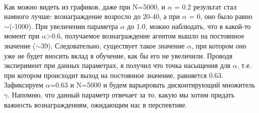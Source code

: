 \documentclass[a4paper]{report}
\theoremstyle{definition}
\theoremstyle{plain}
\theoremstyle{remark}
\theoremstyle{remark}
\theoremstyle{definition}
\begin{document}
\\
Как можно видеть из графиков, даже при N=5000, и $\alpha$ = 0.2 результат стал намного лучше: вознаграждение возросло до 20-40, а при $\alpha$ = 0, оно было равно $\sim$(-1000). При увеличении параметра $\alpha$ до 1.0, можно наблюдать, что в какой-то момент при $\alpha$>0.6, получаемое вознаграждение агентом вышло на постоянное значение ($\sim$39). Следовательно, существует такое значение $\alpha$, при котором оно уже не будет вносить вклад в обучение, как бы его не увеличили. Проводя эксперимент при данных параметрах, я получил что точка насыщения для $\alpha$, т.е. при котором происходит выход на постоянное значение, равняется 0.63.
\\
Зафиксируем $\alpha$=0.63 и N=5000 и будем варьировать дисконтирующий множитель $\gamma$. Напомню, что данный параметр отвечает за то, какую мы хотим придать важность вознаграждениям, ожидающим нас в перспективе.
\end{document}

